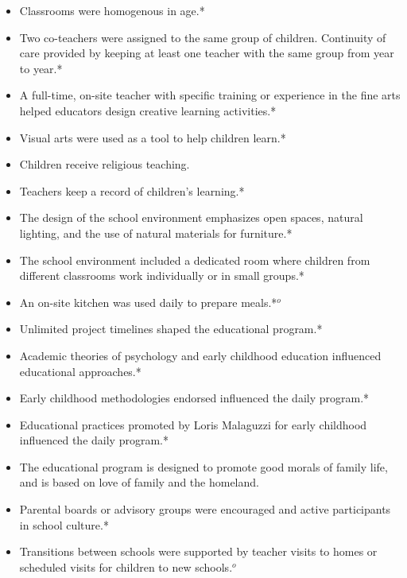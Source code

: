 \documentclass[12pt]{article}
\begin{document}
\begin{itemize}
\begin{itemize}
 	\item Classrooms were homogenous in age.*
 	\item Two co-teachers were assigned to the same group of children. Continuity of care provided by keeping at least one teacher with the same group from year to year.*
 	\item A full-time, on-site teacher with specific training or experience in the fine arts helped educators design creative learning activities.*
 	\item Visual arts were used as a tool to help children learn.*
 	\item Children receive religious teaching.
 	\item Teachers keep a record of children's learning.*
 	\item The design of the school environment emphasizes open spaces, natural lighting, and the use of natural materials for furniture.*
 	\item The school environment included a dedicated room where children from different classrooms work individually or in small groups.*
 	\item An on-site kitchen was used daily to prepare meals.*$^o$
 	\item Unlimited project timelines shaped the educational program.*
 	\item Academic theories of psychology and early childhood education influenced educational approaches.*
 	\item Early childhood methodologies endorsed influenced the daily program.*
 	\item Educational practices promoted by Loris Malaguzzi for early childhood influenced the daily program.*
 	\item The educational program is designed to promote good morals of family life, and is based on love of family and the homeland.
 	\item Parental boards or advisory groups were encouraged and active participants in school culture.*
	\item Transitions between schools were supported by teacher visits to homes or scheduled visits for children to new schools.$^o$
 \end{itemize}
 \end{itemize}
 



\end{document}
